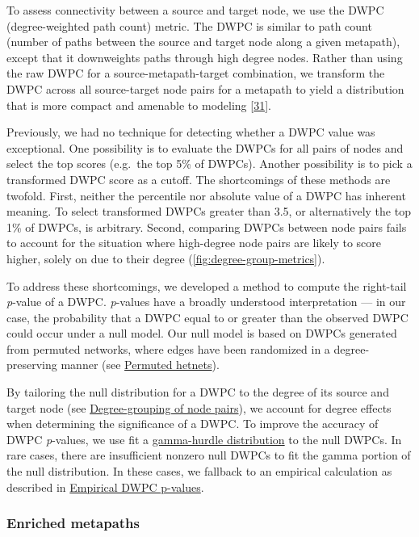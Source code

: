 To assess connectivity between a source and target node,
we use the DWPC (degree-weighted path count) metric.
The DWPC is similar to path count (number of paths between the source and target node along a given metapath),
except that it downweights paths through high degree nodes.
Rather than using the raw DWPC for a source-metapath-target combination,
we transform the DWPC across all source-target node pairs for a metapath to yield a distribution that is more compact and amenable to modeling {[}\protect\hyperlink{ref-17mGFvxXu}{31}{]}.

Previously, we had no technique for detecting whether a DWPC value was exceptional.
One possibility is to evaluate the DWPCs for all pairs of nodes and select the top scores (e.g.~the top 5\% of DWPCs).
Another possibility is to pick a transformed DWPC score as a cutoff.
The shortcomings of these methods are twofold.
First, neither the percentile nor absolute value of a DWPC has inherent meaning.
To select transformed DWPCs greater than 3.5, or alternatively the top 1\% of DWPCs, is arbitrary.
Second, comparing DWPCs between node pairs fails to account for the situation where high-degree node pairs are likely to score higher,
solely on due to their degree (\ref{fig:degree-group-metrics}).

To address these shortcomings,
we developed a method to compute the right-tail \emph{p}-value of a DWPC.
\emph{p}-values have a broadly understood interpretation
--- in our case, the probability that a DWPC equal to or greater than the observed DWPC could occur under a null model.
Our null model is based on DWPCs generated from permuted networks,
where edges have been randomized in a degree-preserving manner (see \protect\hyperlink{permuted-hetnets}{Permuted hetnets}).

By tailoring the null distribution for a DWPC to the degree of its source and target node (see \protect\hyperlink{degree-grouping-of-node-pairs}{Degree-grouping of node pairs}),
we account for degree effects when determining the significance of a DWPC.
To improve the accuracy of DWPC \emph{p}-values,
we use fit a \protect\hyperlink{gamma-hurdle-distribution}{gamma-hurdle distribution} to the null DWPCs.
In rare cases, there are insufficient nonzero null DWPCs to fit the gamma portion of the null distribution.
In these cases, we fallback to an empirical calculation as described in \protect\hyperlink{empirical-dwpc-p-values}{Empirical DWPC p-values}.

\hypertarget{enriched-metapaths}{%
\subsubsection{Enriched metapaths}\label{enriched-metapaths}}

